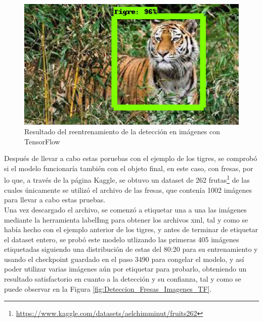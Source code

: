 \begin{figure}[H]
\begin{minipage}{0.46\textwidth}
  \end{minipage}
  \hspace{2mm}
  \begin{minipage}{0.46\textwidth}
    \centering
    \includegraphics[width=\linewidth]{figs/tigre_5_v2.jpeg}
  \end{minipage}
  \caption{Resultado del reentrenamiento de la detección en imágenes con TensorFlow}
  \label{fig:deteccion_tensorflow_tigres_v2}
  \end{figure}


Después de llevar a cabo estas poruebas con el ejemplo de los tigres, se comprobó si el modelo funcionaría también con el objeto final, en este caso, con fresas, por lo que, a través de la página Kaggle, se obtuvo un dataset de 262 frutas\footnote{\url{https://www.kaggle.com/datasets/aelchimminut/fruits262}} de las cuales únicamente se utilizó el archivo de las fresas, que contenía 1002 imágenes para llevar a cabo estas pruebas.\\

Una vez descargado el archivo, se comenzó a etiquetar una a una las imágenes mediante la herramienta labelImg para obtener los archivos xml, tal y como se había hecho con el ejemplo anterior de los tigres, y antes de terminar de etiquetar el dataset entero, se probó este modelo utlizando las primeras 405 imágenes etiquetadas siguiendo una distribución de estas del 80:20 para su entrenamiento y usando el checkpoint guardado en el paso 3490 para congelar el modelo, y así poder utilizar varias imágenes aún por etiquetar para probarlo, obteniendo un resultado satisfactorio en cuanto a la detección y su confianza, tal y como se puede observar en la Figura \ref{fig:Deteccion_Fresas_Imagenes_TF}.

